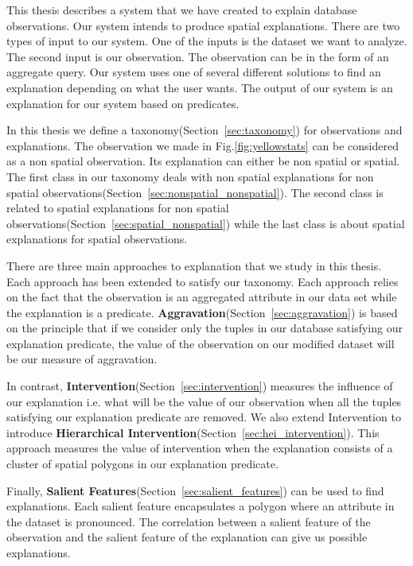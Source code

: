 This thesis describes a system that we have created to explain database observations. Our system intends to produce spatial explanations. There are two types of input to our system. One of the inputs is the dataset we want to analyze. The second input is our observation. The observation can be in the form of an aggregate query. Our system uses one of several different solutions to find an explanation depending on what the user wants. The output of our system is an explanation for our system based on predicates.

In this thesis we define a taxonomy(Section~\ref{sec:taxonomy}) for observations and explanations. The observation we made in Fig.\ref{fig:yellowstats} can be considered as a non spatial observation. Its explanation can either be non spatial or spatial. The first class in our taxonomy deals with non spatial explanations for non spatial observations(Section~\ref{sec:nonspatial_nonspatial}). The second class is related to spatial explanations for non spatial observations(Section~\ref{sec:spatial_nonspatial}) while the last class is about spatial explanations for spatial observations.

There are three main approaches to explanation that we study in this thesis. Each approach has been extended to satisfy our taxonomy. Each approach relies on the fact that the observation is an aggregated attribute in our data set while the explanation is a predicate. \textbf{Aggravation}(Section~\ref{sec:aggravation}) is based on the principle that if we consider only the tuples in our database satisfying our explanation predicate, the value of the observation on our modified dataset will be our measure of aggravation\citep{roy2014formal,meliou2014causality}.

In contrast, \textbf{Intervention}(Section~\ref{sec:intervention}) measures the influence of our explanation i.e. what will be the value of our observation when all the tuples satisfying our explanation predicate are removed\citep{roy2014formal}. We also extend Intervention to introduce \textbf{Hierarchical Intervention}(Section~\ref{sec:hei_intervention}). This approach measures the value of intervention when the explanation consists of a cluster of spatial polygons in our explanation predicate.

Finally, \textbf{Salient Features}(Section~\ref{sec:salient_features}) can be used to find explanations\citep{chirigati2016data}. Each salient feature encapsulates a polygon where an attribute in the dataset is pronounced. The correlation between a salient feature of the observation and the salient feature of the explanation can give us possible explanations.

